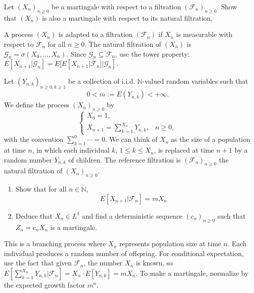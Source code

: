 
\begin{exercise}
Let \((X_n)_{n \geq 0}\) be a martingale with respect to a filtration \((\mathcal{F}_n)_{n \geq 0}\). Show that \((X_n)\) is also a martingale with respect to its natural filtration.

\begin{reminder}
A process \((X_n)\) is adapted to a filtration \((\mathcal{F}_n)\) if \(X_n\) is measurable with respect to \(\mathcal{F}_n\) for all \(n \geq 0\). The natural filtration of \((X_n)\) is \(\mathcal{G}_n = \sigma(X_0, \ldots, X_n)\). Since \(\mathcal{G}_n \subseteq \mathcal{F}_n\), use the tower property: \(E[X_{n+1}|\mathcal{G}_n] = E[E[X_{n+1}|\mathcal{F}_n]|\mathcal{G}_n]\).
\end{reminder}
\end{exercise}

\begin{exercise}
Let \((Y_{n,k})_{n \geq 0, k \geq 1}\) be a collection of i.i.d. \(\mathbb{N}\)-valued random variables such that
\[0 < m := E(Y_{n,k}) < +\infty.\]
We define the process \((X_n)_{n \geq 0}\) by
\[\begin{cases}
X_0 = 1, \\
X_{n+1} = \sum_{k=1}^{X_n} Y_{n,k}, & n \geq 0,
\end{cases}\]
with the convention \(\sum_{k=1}^0 \cdots = 0\). We can think of \(X_n\) as the size of a population at time \(n\), in which each individual \(k\), \(1 \leq k \leq X_n\), is replaced at time \(n + 1\) by a random number \(Y_{n,k}\) of children. The reference filtration is \((\mathcal{F}_n)_{n \geq 0}\) the natural filtration of \((X_n)_{n \geq 0}\).
\begin{enumerate}
    \item Show that for all \(n \in \mathbb{N}\),
    \[E[X_{n+1} | \mathcal{F}_n] = mX_n\]

    \item Deduce that \(X_n \in L^1\) and find a deterministic sequence \((c_n)_{n \geq 0}\) such that \(Z_n = c_nX_n\) is a martingale.
\end{enumerate}

\begin{reminder}
This is a branching process where \(X_n\) represents population size at time \(n\). Each individual produces a random number of offspring. For conditional expectation, use the fact that given \(\mathcal{F}_n\), the number \(X_n\) is known, so \(E[\sum_{k=1}^{X_n} Y_{n,k} | \mathcal{F}_n] = X_n \cdot E[Y_{n,k}] = mX_n\). To make a martingale, normalize by the expected growth factor \(m^n\).
\end{reminder}
\end{exercise}

